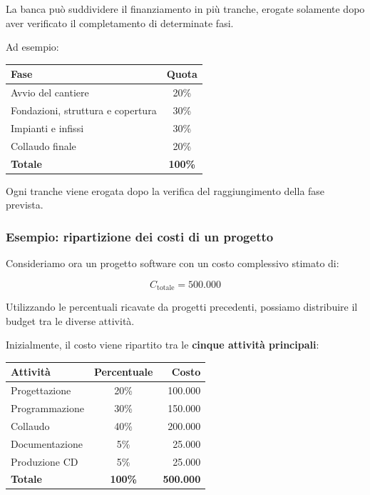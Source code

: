 \medskip

\noindent La banca può suddividere il finanziamento
in più tranche, erogate solamente dopo aver verificato
il completamento di determinate fasi.

\medskip

\noindent Ad esempio:

\begin{center}
\begin{tabular}{|l|c|}
\hline
\textbf{Fase} & \textbf{Quota} \\
\hline
Avvio del cantiere & 20\% \\
\hline
Fondazioni, struttura e copertura & 30\% \\
\hline
Impianti e infissi & 30\% \\
\hline
Collaudo finale & 20\% \\
\hline
\textbf{Totale} & \textbf{100\%} \\
\hline
\end{tabular}
\end{center}

\noindent Ogni tranche viene erogata dopo
la verifica del raggiungimento della fase prevista.


\subsubsection*{Esempio: ripartizione dei costi di un progetto}

\noindent Consideriamo ora un progetto software
con un costo complessivo stimato di:

\[
\boxed{C_{\text{totale}}=500.000}
\]

\noindent Utilizzando le percentuali ricavate
da progetti precedenti, possiamo distribuire
il budget tra le diverse attività.

\medskip

\noindent Inizialmente, il costo viene ripartito
tra le \textbf{cinque attività principali}:

\begin{center}
\begin{tabular}{|l|c|r|}
\hline
\textbf{Attività} & \textbf{Percentuale} &
\textbf{Costo} \\
\hline
Progettazione & 20\% & 100.000 \\
\hline
Programmazione & 30\% & 150.000 \\
\hline
Collaudo & 40\% & 200.000 \\
\hline
Documentazione & 5\% & 25.000 \\
\hline
Produzione CD & 5\% & 25.000 \\
\hline
\textbf{Totale} & \textbf{100\%} & \textbf{500.000} \\
\hline
\end{tabular}
\end{center}

